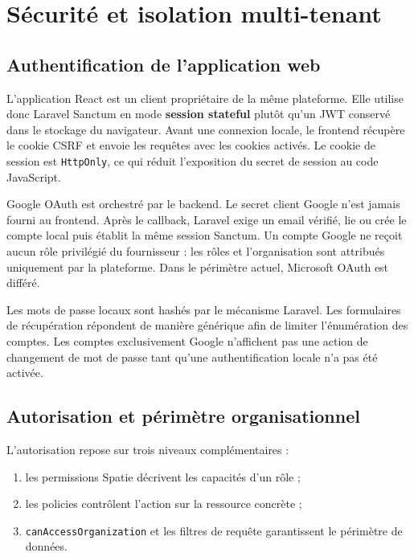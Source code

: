 \section{Sécurité et isolation multi-tenant}

\subsection{Authentification de l'application web}

L'application React est un client propriétaire de la même plateforme. Elle utilise
donc Laravel Sanctum en mode \textbf{session stateful} plutôt qu'un JWT conservé dans
le stockage du navigateur. Avant une connexion locale, le frontend récupère le
cookie CSRF et envoie les requêtes avec les cookies activés. Le cookie de session est
\texttt{HttpOnly}, ce qui réduit l'exposition du secret de session au code
JavaScript.

Google OAuth est orchestré par le backend. Le secret client Google n'est jamais
fourni au frontend. Après le callback, Laravel exige un email vérifié, lie ou crée le
compte local puis établit la même session Sanctum. Un compte Google ne reçoit aucun
rôle privilégié du fournisseur : les rôles et l'organisation sont attribués
uniquement par la plateforme. Dans le périmètre actuel, Microsoft OAuth est différé.

Les mots de passe locaux sont hashés par le mécanisme Laravel. Les formulaires de
récupération répondent de manière générique afin de limiter l'énumération des
comptes. Les comptes exclusivement Google n'affichent pas une action de changement
de mot de passe tant qu'une authentification locale n'a pas été activée.

\subsection{Autorisation et périmètre organisationnel}

L'autorisation repose sur trois niveaux complémentaires :

\begin{enumerate}[leftmargin=8mm]
  \item les permissions Spatie décrivent les capacités d'un rôle ;
  \item les policies contrôlent l'action sur la ressource concrète ;
  \item \texttt{canAccessOrganization} et les filtres de requête garantissent le
  périmètre de données.
\end{enumerate}

